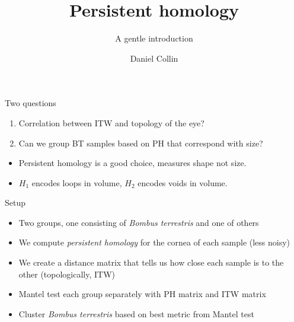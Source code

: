 \documentclass[10pt]{beamer}
\title{Persistent homology}
\subtitle{A gentle introduction}
\date{}
\author{Daniel Collin}
\begin{document}

\begin{frame}[fragile]{Two questions}
  \begin{enumerate}
          \item Correlation between ITW and topology of the eye?
          \item Can we group BT samples based on PH that correspond with size?
          \end{enumerate}
          \begin{itemize}
            \item Persistent homology is a good choice, measures shape not size.
                  \item $H_{1}$ encodes loops in volume, $H_{2}$ encodes voids in volume.
                  \end{itemize}
\end{frame}
\begin{frame}[fragile]{Setup}

  \begin{itemize}
    \item<1-> Two groups, one consisting of \textit{Bombus terrestris} and one of others
    \item<2-> We compute \textit{persistent homology} for the cornea of each sample (less noisy)
    \item<3-> We create a distance matrix that tells us how close each sample is to the other (topologically, ITW)
    \item<4-> Mantel test each group separately with PH matrix and ITW matrix
    \item<5-> Cluster \textit{Bombus terrestris} based on best metric from Mantel test
  \end{itemize}


\end{frame}
\end{document}
